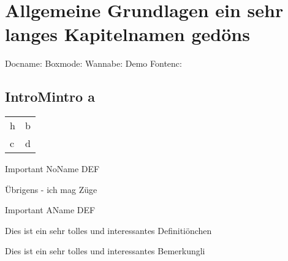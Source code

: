 \documentclass[Typ=Mitschrieb,Vorlesung=LAII]{Lilly}
\begin{document}
  
    \chapter{Allgemeine Grundlagen ein sehr langes Kapitelnamen gedöns} 
    Docname: \LILLYxDOCUMENTNAME\newline
    Boxmode: \LILLYxBOXxMODE\newline
    Wannabe: \LILLYxWANNABExERROR\newline
    Demo Fontenc: \LILLYxDEMOxFONTENC\newline
    
    
    \section{IntroMintro a}
        \begin{tabularx}{\linewidth}{lX}
            h & b \\
            c & d
        \end{tabularx}

        \begin{definition*}
            Important NoName DEF
        \end{definition*}

        \begin{satz}[Übrigens]
            Übrigens - ich mag Züge
        \end{satz}

        \begin{definition*}[Important]
            Important AName DEF
        \end{definition*}

        \begin{definition}
            Dies ist ein sehr tolles und interessantes Definitiönchen
        \end{definition}
        \begin{bemerkung}
            Dies ist ein sehr tolles und interessantes Bemerkungli
        \end{bemerkung}

\end{document}
